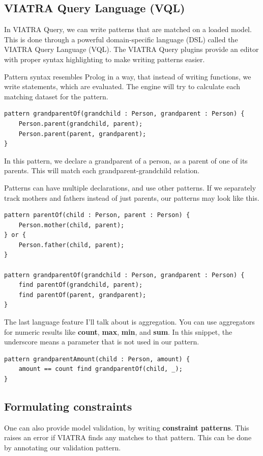 \documentclass[11pt,a4paper,oneside]{report}
\begin{document}
\subsection{VIATRA Query Language (VQL)}
In VIATRA Query, we can write patterns that are matched on a loaded model. This
is done through a powerful domain-specific language (DSL) called the VIATRA
Query Language (VQL). The VIATRA Query plugins provide an editor with proper
syntax highlighting to make writing patterns easier.

Pattern syntax resembles Prolog in a way, that instead of writing functions, we
write statements, which are evaluated. The engine will try to calculate each
matching dataset for the pattern.

\begin{lstlisting}[frame=single]
pattern grandparentOf(grandchild : Person, grandparent : Person) {
    Person.parent(grandchild, parent);
    Person.parent(parent, grandparent);
}
\end{lstlisting}

In this pattern, we declare a grandparent of a person, as a parent of one of its
parents. This will match each grandparent-grandchild relation.

Patterns can have multiple declarations, and use other patterns.
If we separately track mothers and fathers instead of just parents, our patterns
may look like this.

\begin{lstlisting}[frame=single]
pattern parentOf(child : Person, parent : Person) {
    Person.mother(child, parent);
} or {
    Person.father(child, parent);
}

pattern grandparentOf(grandchild : Person, grandparent : Person) {
    find parentOf(grandchild, parent);
    find parentOf(parent, grandparent);
}
\end{lstlisting}

The last language feature I'll talk about is aggregation. You can use
aggregators for numeric results like \textbf{count}, \textbf{max}, \textbf{min},
and \textbf{sum}. In this snippet, the underscore means a parameter that is not
used in our pattern.

\begin{lstlisting}[frame=single]
pattern grandparentAmount(child : Person, amount) {
    amount == count find grandparentOf(child, _);
}
\end{lstlisting}

\subsection{Formulating constraints}
One can also provide model validation, by writing \textbf{constraint patterns}.
This raises an error if VIATRA finds any matches to that pattern. This can be
done by annotating our validation pattern.
\end{document}
